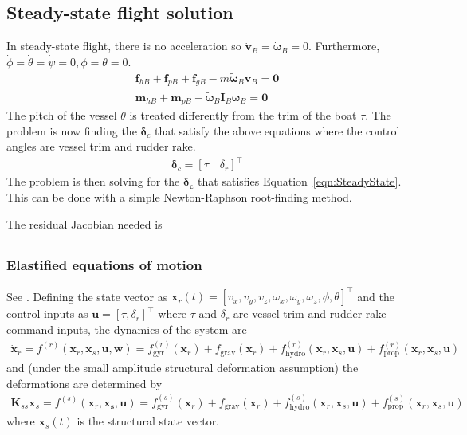\documentclass[10pt]{article}
\newcommand{\mbf}[1]{\mathbf{#1}}
\newcommand{\be}{\begin{eqnarray}}
\newcommand{\ee}{\end{eqnarray}}
\newcommand{\tn}[1]{\textrm{#1}}
\begin{document}
\subsection{Steady-state flight solution}
% 
In steady-state flight, there is no acceleration so $\dot{\mbf{v}}_B=\dot{\boldsymbol{\omega}}_B=0$.
Furthermore, $\dot{\phi}=\dot{\theta}=\dot{\psi} = 0, \phi=\theta=0$.
\be
\label{eqn:SteadyState}
\boxed{
	\mbf{f}_{h B} + \mbf{f}_{p B} + \mbf{f}_{g B} - m \tilde{\boldsymbol{\omega}}_B \mbf{v}_B= \mbf{0}
}
\\
\boxed{\mbf{m}_{h B} + \mbf{m}_{p B} - \tilde{\boldsymbol{\omega}}_B \mbf{I}_B \boldsymbol{\omega}_B = \mbf{0}
}
\ee
The pitch of the vessel $\theta$ is treated differently from the trim of the boat $\tau$.
The problem is now finding the $\boldsymbol{\delta}_c$ that satisfy the above equations where the control angles are vessel trim and rudder rake.
\be
\boldsymbol{\delta}_c = \left[
	\tau \quad \delta_r
	\right]^{\top}
\ee
The problem is then solving for the $\boldsymbol{\delta_c}$ that satisfies Equation~\eqref{eqn:SteadyState}.
This can be done with a simple Newton-Raphson root-finding method.

The residual Jacobian needed is
\be
\ee

\subsubsection{Elastified equations of motion}
See \citet[Sec. 5.3.2]{Palacios2023a}.
Defining the state vector as $\mbf{x}_r(t) = [v_x, v_y, v_z, \omega_x, \omega_y, \omega_z, \phi, \theta]^{\top}$ and the control inputs as $\mbf{u} = [\tau, \delta_r]^{\top}$ where $\tau$ and $\delta_r$ are vessel trim and rudder rake command inputs, the dynamics of the system are
\be
\label{eqn:RigidBody}
\dot{\mbf{x}}_r = f^{(r)}(\mbf{x}_r, \mbf{x}_s, \mbf{u}, \mbf{w})
=
f_{\tn{gyr}}^{(r)}\left(\mbf{x}_r\right) + f_{\tn{grav}} \left(\mbf{x}_r\right)
+ f_{\tn{hydro}}^{(r)}\left(\mbf{x}_r, \mbf{x}_s, \mbf{u}\right)
+ f_{\tn{prop}}^{(r)}\left(\mbf{x}_r, \mbf{x}_s, \mbf{u}\right)
\ee
and (under the small amplitude structural deformation assumption) the deformations are determined by
\be
\label{eqn:Struct}
\mbf{K}_{ss} \mbf{x}_s = f^{(s)}\left(\mbf{x}_r, \mbf{x_s}, \mbf{u}\right)
=
f_{\tn{gyr}}^{(s)}\left(\mbf{x}_r\right) + f_{\tn{grav}}\left(\mbf{x}_r\right)
+ f_{\tn{hydro}}^{(s)}\left(\mbf{x}_r, \mbf{x}_s, \mbf{u}\right)
+ f_{\tn{prop}}^{(s)}\left(\mbf{x}_r, \mbf{x}_s, \mbf{u}\right)
\ee
where $\mbf{x}_s(t)$ is the structural state vector.
\end{document}
